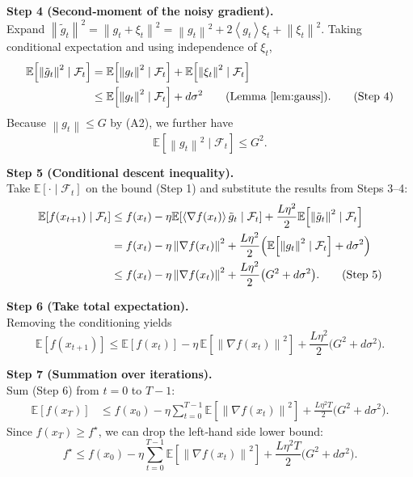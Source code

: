 \documentclass{article}
\newcommand{\EE}{\mathbb{E}}
\newcommand{\norm}[1]{\left\lVert #1 \right\rVert}
\newcommand{\inner}[1]{\left\langle #1 \right\rangle}
\begin{document}
\noindent\textbf{Step 4 (Second‑moment of the noisy gradient).}\\
Expand $\norm{\tilde{g}_{t}}^{2}=\norm{g_{t}+\xi_{t}}^{2}
      =\norm{g_{t}}^{2}+2\inner{g_{t}}{\xi_{t}}+\norm{\xi_{t}}^{2}$.
Taking conditional expectation and using independence of $\xi_{t}$,
\begin{align}
\EE\!\left[\norm{\tilde{g}_{t}}^{2}\mid\mathcal{F}_{t}\right]
&=\EE\!\left[\norm{g_{t}}^{2}\mid\mathcal{F}_{t}\right]
   +\EE\!\left[\norm{\xi_{t}}^{2}\mid\mathcal{F}_{t}\right] \nonumber\\
&\le \EE\!\left[\norm{g_{t}}^{2}\mid\mathcal{F}_{t}\right]+d\sigma^{2}
   \qquad\text{(Lemma~\ref{lem:gauss})}. \tag{Step 4}
\end{align}
Because $\norm{g_{t}}\le G$ by (A2), we further have
\[
\EE\!\left[\norm{g_{t}}^{2}\mid\mathcal{F}_{t}\right]\le G^{2}. \tag{Step 4a}
\]

\noindent\textbf{Step 5 (Conditional descent inequality).}\\
Take $\EE[\cdot\mid\mathcal{F}_{t}]$ on the bound (Step 1) and substitute the results
from Steps 3–4:
\begin{align}
\EE\!\left[f(x_{t+1})\mid\mathcal{F}_{t}\right]
&\le f(x_{t})-\eta\EE\!\left[\inner{\nabla f(x_{t})}{\tilde{g}_{t}}\mid\mathcal{F}_{t}\right]
   +\frac{L\eta^{2}}{2}\EE\!\left[\norm{\tilde{g}_{t}}^{2}\mid\mathcal{F}_{t}\right]\nonumber\\
&= f(x_{t})-\eta\norm{\nabla f(x_{t})}^{2}
   +\frac{L\eta^{2}}{2}\Bigl(\EE\!\left[\norm{g_{t}}^{2}\mid\mathcal{F}_{t}\right]+d\sigma^{2}\Bigr)\nonumber\\
&\le f(x_{t})-\eta\norm{\nabla f(x_{t})}^{2}
   +\frac{L\eta^{2}}{2}\bigl(G^{2}+d\sigma^{2}\bigr). \tag{Step 5}
\end{align}

\noindent\textbf{Step 6 (Take total expectation).}\\
Removing the conditioning yields
\[
\EE\!\left[f(x_{t+1})\right]
\le \EE\!\left[f(x_{t})\right]
      -\eta\,\EE\!\left[\norm{\nabla f(x_{t})}^{2}\right]
      +\frac{L\eta^{2}}{2}\bigl(G^{2}+d\sigma^{2}\bigr). \tag{Step 6}
\]

\noindent\textbf{Step 7 (Summation over iterations).}\\
Sum (Step 6) from $t=0$ to $T-1$:
\begin{align}
\EE\!\left[f(x_{T})\right]
&\le f(x_{0})
   -\eta\sum_{t=0}^{T-1}\EE\!\left[\norm{\nabla f(x_{t})}^{2}\right]
   +\frac{L\eta^{2}T}{2}\bigl(G^{2}+d\sigma^{2}\bigr). \tag{Step 7}
\end{align}
Since $f(x_{T})\ge f^{\star}$, we can drop the left‑hand side lower bound:
\[
f^{\star}\le f(x_{0})
   -\eta\sum_{t=0}^{T-1}\EE\!\left[\norm{\nabla f(x_{t})}^{2}\right]
   +\frac{L\eta^{2}T}{2}\bigl(G^{2}+d\sigma^{2}\bigr). \tag{Step 7a}
\]
\end{document}
